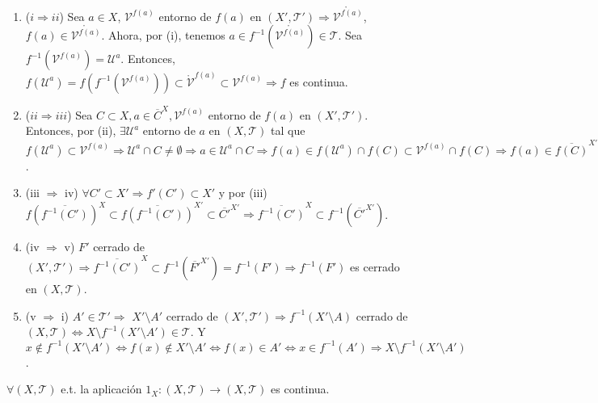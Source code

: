 \begin{dem}
  \begin{enumerate}[label=(\roman*)]
    \item [] ($i \Rightarrow ii$) Sea $a \in X$, $\mathcal{V}^{f(a)}$ entorno de $f(a)$ en $( X', \mathcal{T}' ) \Rightarrow \mathring{\mathcal{V}^{f(a)}}$, $ f(a) \in \mathring{\mathcal{V}^{f(a)}}$. Ahora, por (i), tenemos $a \in f^{-1}(\mathring{\mathcal{V}^{f(a)}}) \in \mathcal{T}$. Sea $f^{-1}(\mathcal{V}^{f(a)}) = \mathcal{U}^{a}$. Entonces, $f(\mathcal{U}^{a}) = f(f^{-1}(\mathcal{V}^{f(a)})) \subset \mathcal{\mathring{V}}^{f(a)} \subset \mathcal{V}^{f(a)} \Rightarrow f$ es continua.
    \item [] ($ii \Rightarrow iii$) Sea $C \subset X, a \in \overline{C}^{X}, \mathcal{V}^{f(a)}$ entorno de $f(a)$ en $( X', \mathcal{T}' )$. Entonces, por (ii), $\exists \mathcal{U}^{a}$ entorno de $a$ en $( X, \mathcal{T} )$ tal que $f(\mathcal{U}^{a}) \subset \mathcal{V}^{f(a)} \Rightarrow \mathcal{U}^{a} \cap C \neq \emptyset \Rightarrow a \in \mathcal{U}^{a} \cap C \Rightarrow f(a) \in f(\mathcal{U}^{a}) \cap f(C) \subset \mathcal{V}^{f(a)} \cap f(C) \Rightarrow f(a) \in \overline{f(C)}^{X'}$.
    \item [](iii $\Rightarrow$ iv) $\forall C' \subset X' \Rightarrow f'(C') \subset X'$ y por (iii) $f(\overline{f^{-1}(C')})^{X} \subset \overline{f(f^{-1}(C'))}^{X'} \subset \overline{C'}^{X'} \Rightarrow \overline{f^{-1}(C')}^{X} \subset f^{-1}(\overline{C'}^{X'})$.
    \item [](iv $\Rightarrow$ v) $F'$ cerrado de $( X', \mathcal{T}' ) \Rightarrow \overline{f^{-1}(C')}^{X} \subset f^{-1}(\overline{F'}^{X'}) = f^{-1}(F') \Rightarrow f^{-1}(F')$ es cerrado en $( X, \mathcal{T} )$.
    \item [] (v $\Rightarrow$ i) $A' \in \mathcal{T}' \Rightarrow $ $X' \setminus A'$ cerrado de $ ( X', \mathcal{T}' ) \Rightarrow f^{-1}(X' \setminus A)$ cerrado de $( X, \mathcal{T} ) \Leftrightarrow X \setminus f^{-1}(X' \setminus A') \in \mathcal{T}$. Y $x \not \in f^{-1}(X' \setminus A') \Leftrightarrow f(x) \not \in X' \setminus A' \Leftrightarrow f(x) \in A' \Leftrightarrow x \in f^{-1}(A') \Rightarrow X \setminus f^{-1}(X' \setminus A')$.
  \end{enumerate}
\end{dem}

\begin{obs}
  $\forall ( X, \mathcal{T} )$ e.t. la aplicación $1_{X}: ( X, \mathcal{T} ) \to ( X, \mathcal{T} )$ es continua.
\end{obs}

